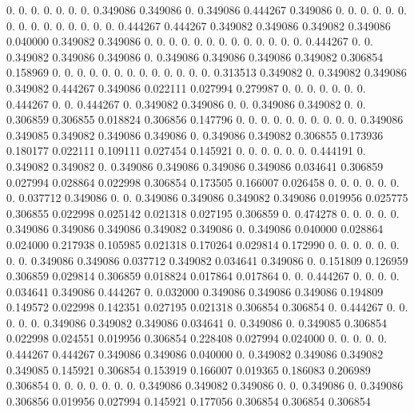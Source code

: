 0.  0.  0.  0.  0.  0.  0.  0.349086   0.349086   0.  0.349086   0.444267   0.349086   0.  0.  0.  0.  0.  0.  0.  0.  0.  0.  
0.  0.  0.  0.  0.  0.444267   0.444267   0.349082   0.349086   0.349082   0.349086   0.040000   0.349082   0.349086   0.  0.  0.  0.  0.  0.  0.  0.  0.  
0.  0.  0.  0.  0.444267   0.  0.  0.349082   0.349086   0.349086   0.  0.349086   0.349086   0.349086   0.349082   0.306854   0.158969   0.  0.  0.  0.  0.  0.  
0.  0.  0.  0.  0.  0.  0.  0.313513   0.349082   0.  0.349082   0.349086   0.349082   0.444267   0.349086   0.022111   0.027994   0.279987   0.  0.  0.  0.  0.  
0.  0.  0.444267   0.  0.  0.444267   0.  0.349082   0.349086   0.  0.  0.349086   0.349082   0.  0.  0.306859   0.306855   0.018824   0.306856   0.147796   0.  0.  0.  
0.  0.  0.  0.  0.  0.  0.  0.349086   0.349085   0.349082   0.349086   0.349086   0.  0.349086   0.349082   0.306855   0.173936   0.180177   0.022111   0.109111   0.027454   0.145921   0.  
0.  0.  0.  0.  0.  0.444191   0.  0.349082   0.349082   0.  0.349086   0.349086   0.349086   0.349086   0.034641   0.306859   0.027994   0.028864   0.022998   0.306854   0.173505   0.166007   0.026458   
0.  0.  0.  0.  0.  0.  0.  0.037712   0.349086   0.  0.  0.349086   0.349086   0.349082   0.349086   0.019956   0.025775   0.306855   0.022998   0.025142   0.021318   0.027195   0.306859   
0.  0.474278   0.  0.  0.  0.  0.  0.349086   0.349086   0.349086   0.349082   0.349086   0.  0.349086   0.040000   0.028864   0.024000   0.217938   0.105985   0.021318   0.170264   0.029814   0.172990   
0.  0.  0.  0.  0.  0.  0.  0.  0.349086   0.349086   0.037712   0.349082   0.034641   0.349086   0.  0.151809   0.126959   0.306859   0.029814   0.306859   0.018824   0.017864   0.017864   
0.  0.  0.444267   0.  0.  0.  0.  0.034641   0.349086   0.444267   0.  0.032000   0.349086   0.349086   0.349086   0.194809   0.149572   0.022998   0.142351   0.027195   0.021318   0.306854   0.306854   
0.  0.444267   0.  0.  0.  0.  0.  0.349086   0.349082   0.349086   0.034641   0.  0.349086   0.  0.349085   0.306854   0.022998   0.024551   0.019956   0.306854   0.228408   0.027994   0.024000   
0.  0.  0.  0.  0.  0.444267   0.444267   0.349086   0.349086   0.040000   0.  0.349082   0.349086   0.349082   0.349085   0.145921   0.306854   0.153919   0.166007   0.019365   0.186083   0.206989   0.306854   
0.  0.  0.  0.  0.  0.  0.  0.349086   0.349082   0.349086   0.  0.  0.349086   0.  0.349086   0.306856   0.019956   0.027994   0.145921   0.177056   0.306854   0.306854   0.306854   
